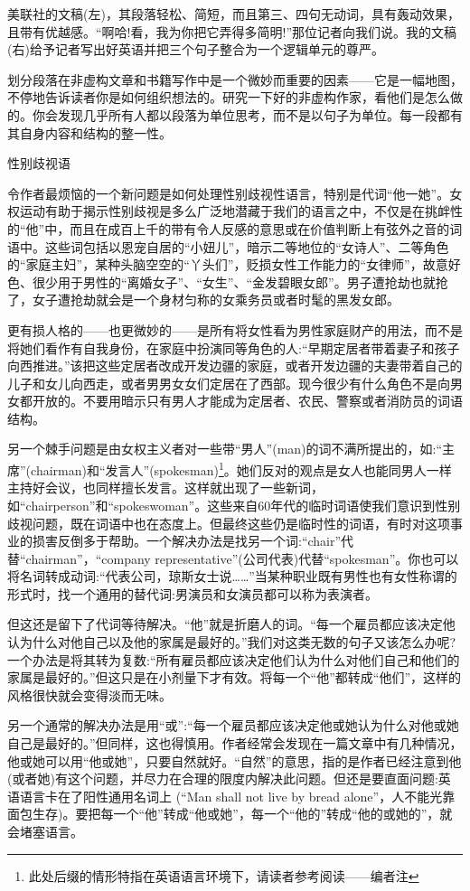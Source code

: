 美联社的文稿(左)，其段落轻松、简短，而且第三、四句无动词，具有轰动效果，且带有优越感。“啊哈!看，我为你把它弄得多简明!”那位记者向我们说。我的文稿(右)给予记者写出好英语并把三个句子整合为一个逻辑单元的尊严。


划分段落在非虚构文章和书籍写作中是一个微妙而重要的因素——它是一幅地图，不停地告诉读者你是如何组织想法的。研究一下好的非虚构作家，看他们是怎么做的。你会发现几乎所有人都以段落为单位思考，而不是以句子为单位。每一段都有其自身内容和结构的整一性。

性别歧视语

令作者最烦恼的一个新问题是如何处理性别歧视性语言，特别是代词“他一她”。女权运动有助于揭示性别歧视是多么广泛地潜藏于我们的语言之中，不仅是在挑衅性的“他”中，而且在成百上千的带有令人反感的意思或在价值判断上有弦外之音的词语中。这些词包括以恩宠自居的“小妞儿”，暗示二等地位的“女诗人”、二等角色的“家庭主妇”，某种头脑空空的“丫头们”，贬损女性工作能力的“女律师”，故意好色、很少用于男性的“离婚女子”、“女生”、“金发碧眼女郎”。男子遭抢劫也就抢了，女子遭抢劫就会是一个身材匀称的女乘务员或者时髦的黑发女郎。

更有损人格的——也更微妙的——是所有将女性看为男性家庭财产的用法，而不是将她们看作有自我身份，在家庭中扮演同等角色的人:“早期定居者带着妻子和孩子向西推进。”该把这些定居者改成开发边疆的家庭，或者开发边疆的夫妻带着自己的儿子和女儿向西走，或者男男女女们定居在了西部。现今很少有什么角色不是向男女都开放的。不要用暗示只有男人才能成为定居者、农民、警察或者消防员的词语结构。

另一个棘手问题是由女权主义者对一些带“男人”(man)的词不满所提出的，如:“主席”(chairman)和“发言人”(spokesman)\footnote{此处后缀的情形特指在英语语言环境下，请读者参考阅读——编者注}。她们反对的观点是女人也能同男人一样主持好会议，也同样擅长发言。这样就出现了一些新词，如“chairperson”和“spokeswoman”。这些来自60年代的临时词语使我们意识到性别歧视问题，既在词语中也在态度上。但最终这些仍是临时性的词语，有时对这项事业的损害反倒多于帮助。一个解决办法是找另一个词:“chair”代替“chairman”，“company representative”(公司代表)代替“spokesman”。你也可以将名词转成动词:“代表公司，琼斯女士说……”当某种职业既有男性也有女性称谓的形式时，找一个通用的替代词:男演员和女演员都可以称为表演者。

但这还是留下了代词等待解决。“他”就是折磨人的词。“每一个雇员都应该决定他认为什么对他自己以及他的家属是最好的。”我们对这类无数的句子又该怎么办呢?一个办法是将其转为复数:“所有雇员都应该决定他们认为什么对他们自己和他们的家属是最好的。”但这只是在小剂量下才有效。将每一个“他”都转成“他们”，这样的风格很快就会变得淡而无味。

另一个通常的解决办法是用“或”:“每一个雇员都应该决定他或她认为什么对他或她自己是最好的。”但同样，这也得慎用。作者经常会发现在一篇文章中有几种情况，他或她可以用“他或她”，只要自然就好。“自然”的意思，指的是作者已经注意到他(或者她)有这个问题，并尽力在合理的限度内解决此问题。但还是要直面问题:英语语言卡在了阳性通用名词上
(“Man shall not live by bread alone”，人不能光靠面包生存)。要把每一个“他”转成“他或她”，每一个“他的”转成“他的或她的”，就会堵塞语言。

